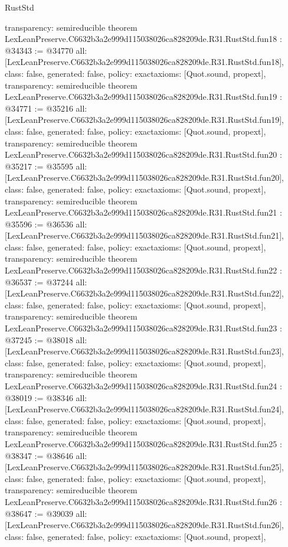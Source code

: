 \begin{lexlean}{RustStd}
\begin{coremodule}
{  transparency: semireducible
}
theorem LexLeanPreserve.C6632b3a2e999d115038026ca828209de.R31.RustStd.fun18 : @34343 := @34770 {
  all: [LexLeanPreserve.C6632b3a2e999d115038026ca828209de.R31.RustStd.fun18],
  class: false,
  generated: false,
  policy: exact{axioms: [Quot.sound, propext]},
  transparency: semireducible
}
theorem LexLeanPreserve.C6632b3a2e999d115038026ca828209de.R31.RustStd.fun19 : @34771 := @35216 {
  all: [LexLeanPreserve.C6632b3a2e999d115038026ca828209de.R31.RustStd.fun19],
  class: false,
  generated: false,
  policy: exact{axioms: [Quot.sound, propext]},
  transparency: semireducible
}
theorem LexLeanPreserve.C6632b3a2e999d115038026ca828209de.R31.RustStd.fun20 : @35217 := @35595 {
  all: [LexLeanPreserve.C6632b3a2e999d115038026ca828209de.R31.RustStd.fun20],
  class: false,
  generated: false,
  policy: exact{axioms: [Quot.sound, propext]},
  transparency: semireducible
}
theorem LexLeanPreserve.C6632b3a2e999d115038026ca828209de.R31.RustStd.fun21 : @35596 := @36536 {
  all: [LexLeanPreserve.C6632b3a2e999d115038026ca828209de.R31.RustStd.fun21],
  class: false,
  generated: false,
  policy: exact{axioms: [Quot.sound, propext]},
  transparency: semireducible
}
theorem LexLeanPreserve.C6632b3a2e999d115038026ca828209de.R31.RustStd.fun22 : @36537 := @37244 {
  all: [LexLeanPreserve.C6632b3a2e999d115038026ca828209de.R31.RustStd.fun22],
  class: false,
  generated: false,
  policy: exact{axioms: [Quot.sound, propext]},
  transparency: semireducible
}
theorem LexLeanPreserve.C6632b3a2e999d115038026ca828209de.R31.RustStd.fun23 : @37245 := @38018 {
  all: [LexLeanPreserve.C6632b3a2e999d115038026ca828209de.R31.RustStd.fun23],
  class: false,
  generated: false,
  policy: exact{axioms: [Quot.sound, propext]},
  transparency: semireducible
}
theorem LexLeanPreserve.C6632b3a2e999d115038026ca828209de.R31.RustStd.fun24 : @38019 := @38346 {
  all: [LexLeanPreserve.C6632b3a2e999d115038026ca828209de.R31.RustStd.fun24],
  class: false,
  generated: false,
  policy: exact{axioms: [Quot.sound, propext]},
  transparency: semireducible
}
theorem LexLeanPreserve.C6632b3a2e999d115038026ca828209de.R31.RustStd.fun25 : @38347 := @38646 {
  all: [LexLeanPreserve.C6632b3a2e999d115038026ca828209de.R31.RustStd.fun25],
  class: false,
  generated: false,
  policy: exact{axioms: [Quot.sound, propext]},
  transparency: semireducible
}
theorem LexLeanPreserve.C6632b3a2e999d115038026ca828209de.R31.RustStd.fun26 : @38647 := @39039 {
  all: [LexLeanPreserve.C6632b3a2e999d115038026ca828209de.R31.RustStd.fun26],
  class: false,
  generated: false,
  policy: exact{axioms: [Quot.sound, propext]},
}
\end{coremodule}
\end{lexlean}
